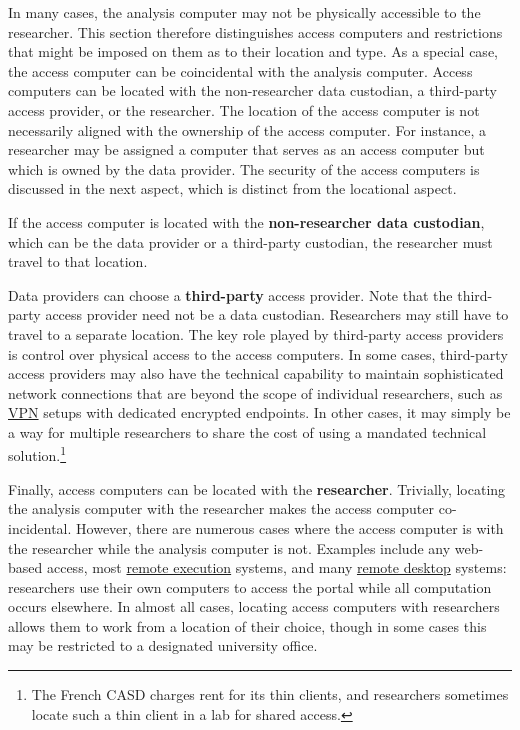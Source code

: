 In many cases, the analysis computer may not be physically accessible to the researcher. This section therefore distinguishes access computers and restrictions that might be imposed on them as to their location and type. As a special case, the access computer can be coincidental with the analysis computer. Access computers can be located with the non-researcher data custodian, a third-party access provider, or the researcher. The location of the access computer is not necessarily aligned with the ownership of the access computer. For instance, a researcher may be assigned a computer that serves as an access computer but which is owned by the data provider. The security of the access computers is discussed in the next aspect, which is distinct from the locational aspect.

If the access computer is located with the \textbf{non-researcher data custodian}, which can be the data provider or a third-party custodian, the researcher must travel to that location.

Data providers can choose a \textbf{third-party} access provider. Note that the third-party access provider need not be a data custodian. Researchers may still have to travel to a separate location. The key role played by third-party access providers is control over physical access to the access computers. In some cases, third-party access providers may also have the technical capability to maintain sophisticated network connections that are beyond the scope of individual researchers, such as \protect\hyperlink{virtual-private-networks}{VPN} setups with dedicated encrypted endpoints. In other cases, it may simply be a way for multiple researchers to share the cost of using a mandated technical solution.\footnote{The French CASD charges rent for its thin clients, and researchers sometimes locate such a thin client in a lab for shared access.}

Finally, access computers can be located with the \textbf{researcher}. Trivially, locating the analysis computer with the researcher makes the access computer co-incidental. However, there are numerous cases where the access computer is with the researcher while the analysis computer is not. Examples include any web-based access, most \protect\hyperlink{remote-execution}{remote execution} systems, and many \protect\hyperlink{remote-desktop}{remote desktop} systems: researchers use their own computers to access the portal while all computation occurs elsewhere. In almost all cases, locating access computers with researchers allows them to work from a location of their choice, though in some cases this may be restricted to a designated university office.

